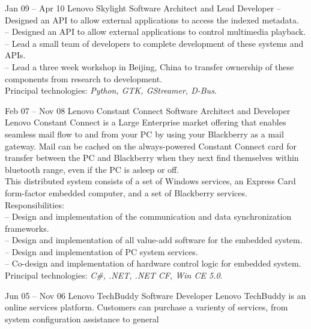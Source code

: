 \documentclass[a4paper, 10pt]{article}
\begin{document}
\begin{resume}
\begin{project} {Jan 09 -- Apr 10} {Lenovo Skylight} {Software Architect and Lead Developer}
            -- Designed an API to allow external applications to access the indexed metadata. \\
            -- Designed an API to allow external applications to control multimedia playback. \\
            -- Lead a small team of developers to complete development of these systems and APIs. \\
            -- Lead a three week workshop in Beijing, China to transfer ownership of these components from research to development.
            \\[1ex]
            Principal technologies: \emph{Python, GTK, GStreamer, D-Bus}.
        \end{project}
        \begin{project}{Feb 07 -- Nov 08} {Lenovo Constant Connect} {Software Architect and Developer}
            Lenovo Constant Connect is a Large Enterprise market offering that enables
            seamless mail flow to and from your PC by using your Blackberry as a mail
            gateway.  Mail can be cached on the always-powered Constant Connect card for
            transfer between the PC and Blackberry when they next find themselves within
            bluetooth range, even if the PC is asleep or off.
            \\[1ex]
            This distributed system consists of a set of Windows services, an Express Card
            form-factor embedded computer, and a set of Blackberry services.
            \\[1ex]
            Responsibilities: \\
            -- Design and implementation of the communication and data synchronization frameworks. \\
            -- Design and implementation of all value-add software for the embedded system. \\
            -- Design and implementation of PC system services. \\
            -- Co-design and implementation of hardware control logic for embedded system.
            \\[1ex]
            Principal technologies: \emph{C\#, .NET, .NET CF, Win CE 5.0}.
        \end{project}
        \begin{project} {Jun 05 -- Nov 06} {Lenovo TechBuddy} {Software Developer}
            Lenovo TechBuddy is an online services platform.  Customers can purchase
            a varienty of services, from system configuration assistance to general

\end{project}
\end{resume}
\end{document}
